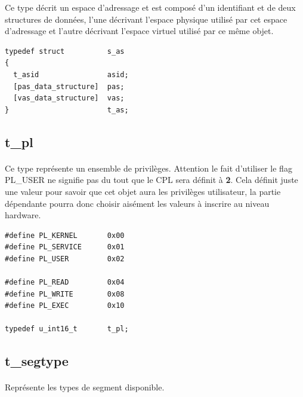 \documentclass[10pt,a4wide]{article}
\begin{document}
Ce type d\'ecrit un espace d'adressage et est compos\'e d'un identifiant et
de deux structures de donn\'ees, l'une d\'ecrivant l'espace physique utilis\'e
par cet espace d'adressage et l'autre d\'ecrivant l'espace virtuel utilis\'e
par ce m\^eme objet.

\begin{verbatim}
typedef struct          s_as
{
  t_asid                asid;
  [pas_data_structure]  pas;
  [vas_data_structure]  vas;
}                       t_as;
\end{verbatim}

\subsection{t\_pl}

\paragraph{}

Ce type repr\'esente un ensemble de privil\`eges. Attention le fait
d'utiliser le flag PL\_USER ne signifie pas du tout que le CPL sera
d\'efinit \`a \textbf{2}. Cela d\'efinit juste une valeur pour savoir
que cet objet aura les privil\`eges utilisateur, la partie d\'ependante
pourra donc choisir ais\'ement les valeurs \`a inscrire au niveau hardware.

\begin{verbatim}
#define PL_KERNEL       0x00
#define PL_SERVICE      0x01
#define PL_USER         0x02

#define PL_READ         0x04
#define PL_WRITE        0x08
#define PL_EXEC         0x10

typedef u_int16_t       t_pl;
\end{verbatim}

\subsection{t\_segtype}

\paragraph{}

Repr\'esente les types de segment disponible.

\paragraph{}
\end{document}
